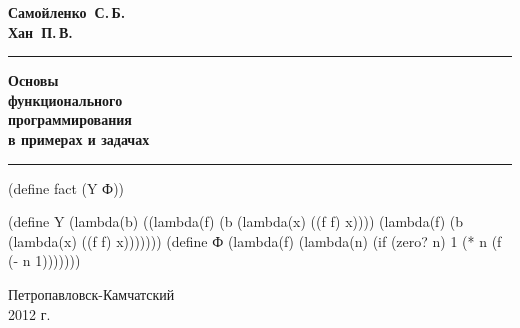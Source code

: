 \newcommand{\titlefont}{\color{red!30!black}\bfseries}

\begin{flushright}
\thispagestyle{empty}

\vspace{1cm}
\Large
\textbf{Самойленко~С.\,Б.}\\
\textbf{Хан~П.\,В.}
\normalfont

\vspace{2cm}

\hrule
\bigskip
           \HUGE\titlefont
            Основы\\
            функционального\\
            программирования\\
            \huge\normalcolor\normalfont
            в примерах и задачах
\bigskip
\hrule
\vspace{2cm}
\begin{SchemeCode}[emph={n,b,f,x},
basicstyle={\schemestyle\color{gray!80!blue}},
classoffset=0,
keywordstyle={\schemestyle\color{gray!80!purple}},
classoffset=1,
keywordstyle={\bfseries\color{gray!70!blue}},
classoffset=0,
emphstyle={\itshape\color{gray!80!blue}}]
    (define fact (Y Ф))
    
    (define Y (lambda(b) ((lambda(f) (b (lambda(x) ((f f) x))))
                     (lambda(f) (b (lambda(x) ((f f) x)))))))
    (define Ф
      (lambda(f)
        (lambda(n)
          (if (zero? n) 
              1 
              (* n (f (- n 1)))))))

\end{SchemeCode}
\vfill
\normalsize
Петропавловск-Камчатский\\
2012 г.

\end{flushright}
